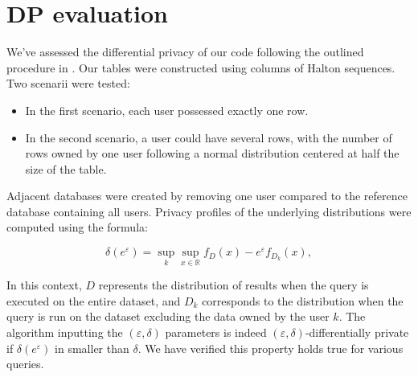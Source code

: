 \documentclass[letterpaper]{article} %
\begin{document}
\section*{DP evaluation}
We've assessed the differential privacy of our code following the outlined procedure in \citeauthor{wilson2019differentially}. Our tables were constructed using columns of Halton sequences.
Two scenarii were tested:

\begin{itemize}
    \item In the first scenario, each user possessed exactly one row.
    \item In the second scenario, a user could have several rows, with the number of rows owned by one user following a normal distribution centered at half the size of the table.
\end{itemize}

Adjacent databases were created by removing one user compared to the reference database containing all users. Privacy profiles of the underlying distributions were computed using the formula:

\begin{equation}
    \delta(e^{\varepsilon}) = \sup_{k} \sup_{x\in\mathbb{R}} f_{D}(x) - e^{\varepsilon}f_{D_k}(x),
\end{equation}

In this context, $D$ represents the distribution of results when the query is executed on the entire dataset,
and $D_k$ corresponds to the distribution when the query is run on the dataset excluding the data owned by the user $k$.
The algorithm inputting the $(\varepsilon, \delta)$ parameters is indeed $(\varepsilon, \delta)$-differentially private if $\delta(e^{\varepsilon})$ in smaller than $\delta$.
We have verified this property holds true for various queries.
\end{document}
